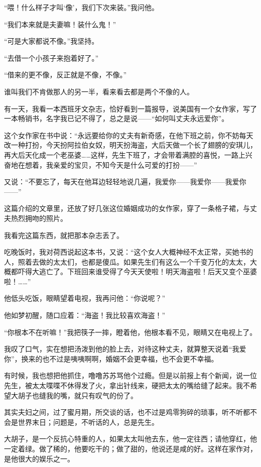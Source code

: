 \par “喂！什么样子才叫‘像’，我们下次来装。”我问他。
\par “我们本来就是夫妻嘛！装什么鬼！”
\par “可是大家都说不像。”我坚持。
\par “去借一个小孩子来抱着好了。”
\par “借来的更不像，反正就是不像，不像。”
\par 谁叫我们不肯做那人的另一半，看来看去都是两个不像的人。
\par 有一天，我看一本西班牙文杂志，恰好看到一篇报导，说美国有一个女作家，写了一本畅销书，名字我已记不得了，总之是说——“如何叫丈夫永远爱你”。
\par 这个女作家在书中说：“永远要给你的丈夫有新奇感，在他下班之前，你不妨每天改一种打扮，今天扮阿拉伯女奴，明天扮海盗，大后天做一个长了翅膀的安琪儿，再大后天化成一个老巫婆……这样，先生下班了，才会带着满腔的喜悦，一路上兴奋地在想着，我亲爱的宝贝，不知今天是什么可爱的打扮——”
\par 又说：“不要忘了，每天在他耳边轻轻地说几遍，我爱你——我爱你——我爱你——”
\par 这篇介绍的文章里，还放了好几张这位婚姻成功的女作家，穿了一条格子裙，与丈夫热烈拥吻的照片。
\par 我看完这篇东西，就把那本杂志丢了。
\par 吃晚饭时，我对荷西说起这本书，又说：“这个女人大概神经不太正常，买她书的人，照着去做的太太们，也都是傻瓜。如果先生们有这么一个千变万化的太太，大概都吓得大逃亡了。下班回来谁受得了今天天使啦！明天海盗啦！后天又变个巫婆啦！……”
\par 他低头吃饭，眼睛望着电视，我再问他：“你说呢？”
\par 他如梦初醒，随口应着：“海盗！我比较喜欢海盗！”
\par “你根本不在听嘛！”我把筷子一摔，瞪着他，他根本看不见，眼睛又在电视上了。
\par 我叹了口气，实在想把汤泼到他的脸上去，对待这种丈夫，就算整天说着“我爱你”，换来的也不过是咦咦啊啊，婚姻不会更幸福，也不会更不幸福。
\par 有时候，我也想把他抓住，噜噜苏苏骂他个过瘾。但是以前报上有个新闻，说一位先生，被太太喋喋不休得发了火，拿出针线来，硬把太太的嘴给缝了起来。我不希望大胡子也缝我的嘴，就只有叹气的份了。
\par 其实夫妇之间，过了蜜月期，所交谈的话，也不过是鸡零狗碎的琐事，听不听都不会是世界末日；问题是，不听话的人，总是先生。
\par 大胡子，是一个反抗心特重的人，如果太太叫他去东，他一定往西；请他穿红，他一定着绿。做了稀的，他要吃干的；做了甜的，他说还是咸的好。这样在家作对，是他很大的娱乐之一。
